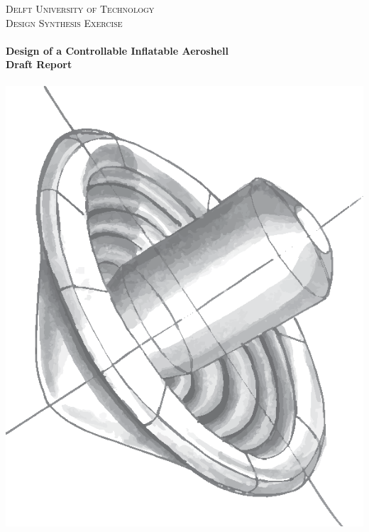 \begin{titlepage}
\begin{center}

\textsc{\LARGE Delft University of Technology}\\[0.3cm]
\textsc{\Large Design Synthesis Exercise}\\[0.5cm]

\HRule \\[0.4cm]
{\Large \bfseries Design of a Controllable Inflatable Aeroshell}\\[0.2cm]
{\Huge \bfseries Draft Report}\\[0.2cm]
\HRule \\[0.5cm]

\includegraphics[scale=1.05]{./Titlepage/stacked_toroid}\\[0.5cm]



\end{center}
\end{titlepage}
